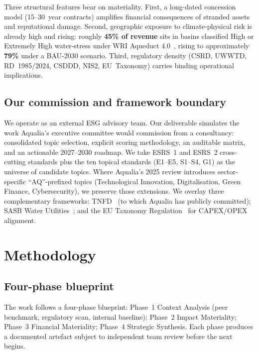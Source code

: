 \documentclass[11pt, a4paper]{article}
\newcommand{\sig}[1]{\textbf{#1}}
\begin{document}
Three structural features bear on materiality. First, a long-dated concession model (15--30~year contracts) amplifies financial consequences of stranded assets and reputational damage. Second, geographic exposure to climate-physical risk is already high and rising: roughly \sig{45\% of revenue} sits in basins classified High or Extremely High water-stress under WRI Aqueduct 4.0~\cite{aqueduct2023}, rising to approximately \sig{79\%} under a BAU-2030 scenario. Third, regulatory density (CSRD, UWWTD, RD~1985/2024, CSDDD, NIS2, EU~Taxonomy) carries binding operational implications.

\subsection{Our commission and framework boundary}

We operate as an external ESG advisory team. Our deliverable simulates the work Aqualia's executive committee would commission from a consultancy: consolidated topic selection, explicit scoring methodology, an auditable matrix, and an actionable 2027--2030 roadmap. We take ESRS~1 and ESRS~2 cross-cutting standards plus the ten topical standards (E1--E5, S1--S4, G1) as the universe of candidate topics. Where Aqualia's 2025 review introduces sector-specific ``AQ''-prefixed topics (Technological Innovation, Digitalisation, Green Finance, Cybersecurity), we preserve those extensions. We overlay three complementary frameworks: TNFD~\cite{tnfd2023} (to which Aqualia has publicly committed); SASB Water Utilities~\cite{sasb2024}; and the EU Taxonomy Regulation~\cite{taxonomy2020} for CAPEX/OPEX alignment.

\section{Methodology}
\label{sec:method}

\subsection{Four-phase blueprint}

The work follows a four-phase blueprint: Phase~1 Context Analysis (peer benchmark, regulatory scan, internal baseline); Phase~2 Impact Materiality; Phase~3 Financial Materiality; Phase~4 Strategic Synthesis. Each phase produces a documented artefact subject to independent team review before the next begins.
\end{document}

